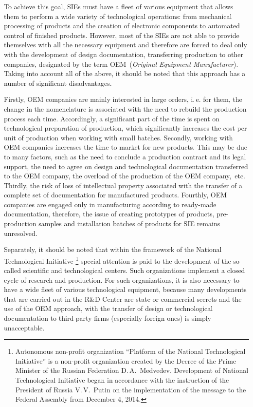 To achieve this goal, SIEs must have a fleet of various equipment that allows them to perform a wide variety of technological operations: from mechanical processing of products and the creation of electronic components to automated control of finished products. However, most of the SIEs are not able to provide themselves with all the necessary equipment and therefore are forced to deal only with the development of design documentation, transferring production to other companies, designated by the term OEM~(\textit {Original Equipment Manufacturer}). Taking into account all of the above, it should be noted that this approach has a number of significant disadvantages.

Firstly, OEM companies are mainly interested in large orders, i.\,e. for them, the change in the nomenclature is associated with the need to rebuild the production process each time. Accordingly, a significant part of the time is spent on technological preparation of production, which significantly increases the cost per unit of production when working with small batches. Secondly, working with OEM companies increases the time to market for new products. This may be due to many factors, such as the need to conclude a production contract and its legal support, the need to agree on design and technological documentation transferred to the OEM company, the overload of the production of the OEM company,~etc. Thirdly, the risk of loss of intellectual property associated with the transfer of a complete set of documentation for manufactured products. Fourthly, OEM companies are engaged only in manufacturing according to ready-made documentation, therefore, the issue of creating prototypes of products, pre-production samples and installation batches of products for SIE remains unresolved.

Separately, it should be noted that within the framework of the National Technological Initiative \footnote {Autonomous non-profit organization ``Platform of the National Technological Initiative'' is a non-profit organization created by the Decree of the Prime Minister of the Russian Federation D.\,A.~Medvedev. Development of National Technological Initiative began in accordance with the instruction of the President of Russia V.\,V.~Putin on the implementation of the message to the Federal Assembly from December 4, 2014.} special attention is paid to the development of the so-called scientific and technological centers. Such organizations implement a closed cycle of research and production. For such organizations, it is also necessary to have a wide fleet of various technological equipment, because many developments that are carried out in the R\&D Center are state or commercial secrets and the use of the OEM approach, with the transfer of design or technological documentation to third-party firms (especially foreign ones) is simply unacceptable.

